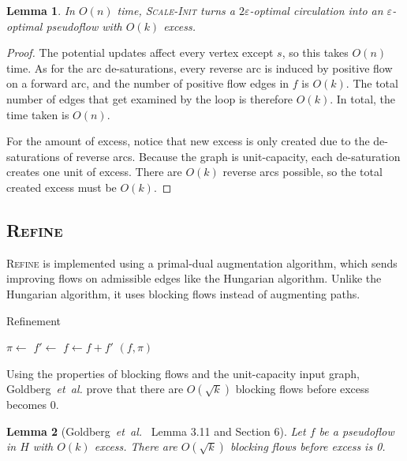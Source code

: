 \documentclass[11pt]{article}
\def\etal{\textsl{et~al.}}
\def\eps{\varepsilon}
\theoremstyle{plain}
\newtheorem{lemma}{Lemma}
\begin{document}
\begin{lemma}
\label{lemma:scale_init}
In $O(n)$ time, \textsc{Scale-Init} turns a $2\eps$-optimal circulation into an
$\eps$-optimal pseudoflow with $O(k)$ excess.
\end{lemma}

\begin{proof}
The potential updates affect every vertex except $s$, so this takes $O(n)$
time.
As for the arc de-saturations, every reverse arc is induced by positive flow on
a forward arc, and the number of positive flow edges in $f$ is $O(k)$.
The total number of edges that get examined by the loop is therefore $O(k)$.
In total, the time taken is $O(n)$.

For the amount of excess, notice that new excess is only created due to the
de-saturations of reverse arcs.
Because the graph is unit-capacity, each de-saturation creates one unit of
excess.
There are $O(k)$ reverse arcs possible, so the total created excess must be
$O(k)$.
\end{proof}

\subsection{\textsc{Refine}}

\textsc{Refine} is implemented using a primal-dual augmentation algorithm,
which sends improving flows on admissible edges like the Hungarian algorithm.
Unlike the Hungarian algorithm, it uses blocking flows instead of augmenting
paths.

\begin{algorithm}
\caption{Refinement}
\begin{algorithmic}[1]
		\State $\pi \gets$ 
		\State $f' \gets$ 
		\State $f \gets f + f'$
	\EndWhile
	\State\Return $(f, \pi)$
\EndFunction
\end{algorithmic}
\end{algorithm}

Using the properties of blocking flows and the unit-capacity input graph,
Goldberg~{\etal} prove that there are $O(\sqrt{k})$ blocking flows before
excess becomes 0.

\begin{lemma}[Goldberg~{\etal}~\cite{GHKT17} Lemma 3.11 and Section 6]
Let $f$ be a pseudoflow in $H$ with $O(k)$ excess.
There are $O(\sqrt{k})$ blocking flows before excess is 0.
\end{lemma}
\end{document}
